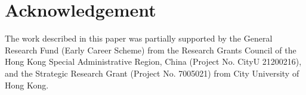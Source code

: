 \documentclass[preprint,12pt]{elsarticle}
\begin{document}
\section*{Acknowledgement}
The work described in this paper was partially supported by the General Research Fund (Early Career Scheme) from the Research Grants Council of the Hong Kong Special Administrative Region, China (Project No. CityU 21200216), and the Strategic Research Grant (Project No. 7005021) from City University of Hong Kong.




\end{document}

